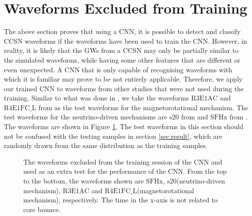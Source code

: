 \documentclass[aps,twocolumn,showpacs,groupedaddress, nofootinbib]{revtex4}  %
\begin{document}
\section{Waveforms Excluded from Training}\label{sec:unseen}
The above section proves that using a \ac{CNN}, it is possible to detect and classify \ac{CCSN} waveforms 
if the waveforms have been used to train the \ac{CNN}. 
However, in reality, it is likely that the \acp{GW} from a \ac{CCSN} may only be partially similar to the simulated waveforms, 
while having some other features that are different or even unexpected. 
A \ac{CNN} that is only capable of recognising waveforms with which it is familiar may prove to be not entirely applicable.
Therefore, we apply our trained \ac{CNN} to waveforms from other studies that were not used during the training.
Similar to what was done in \cite{roma2019astrophysics}, 
we take the waveforms $\text{R3E1AC}$ and $\text{R4E1FC\_L}$ from \cite{scheidegger2010influence} as the test waveforms for the magnetorotational mechanism.
The test waveforms for the neutrino-driven mechanisms are $\text{s}20$ from \cite{andresen2017gravitational} and $\text{SFHx}$ from \cite{kuroda2016new}.
The waveforms are shown in Figure \ref{fig:Extratestwaveform}.
The test waveforms in this section should not be confused with the testing samples in section \ref{sec:result}, 
which are randomly drawn from the same distribution as the training samples.
\begin{figure}
     \begin{center}
%
        \quad
%
    \end{center}
    \caption{The waveforms excluded from the training session of the \ac{CNN} and used as an extra test for the performance of the \ac{CNN}.
    From the top to the bottom, the waveforms shown are $\text{SFHx}$, $\text{s}20$(neutrino-driven mechanism), 
    $\text{R3E1AC}$ and $\text{R4E1FC\_L}$(magnetorotational mechanism), respectively. 
    The time in the x-axis is not related to core bounce.
\label{fig:Extratestwaveform}}%
\end{figure}
\end{document}
